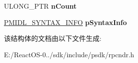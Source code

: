 \begin{DoxyCompactItemize}
\item 
\mbox{\label{struct___m_i_d_l___s_e_r_v_e_r___i_n_f_o___aa700179b16ffed2bd8a40cac7fc333ea}} 
U\+L\+O\+N\+G\+\_\+\+P\+TR {\bfseries n\+Count}
\item 
\mbox{\label{struct___m_i_d_l___s_e_r_v_e_r___i_n_f_o___a799af66d7416ee1767e28c9df39c5da6}} 
\hyperlink{struct___m_i_d_l___s_y_n_t_a_x___i_n_f_o}{P\+M\+I\+D\+L\+\_\+\+S\+Y\+N\+T\+A\+X\+\_\+\+I\+N\+FO} {\bfseries p\+Syntax\+Info}
\end{DoxyCompactItemize}


该结构体的文档由以下文件生成\+:\begin{DoxyCompactItemize}
\item 
E\+:/\+React\+O\+S-\/0../sdk/include/psdk/rpcndr.\+h\end{DoxyCompactItemize}
